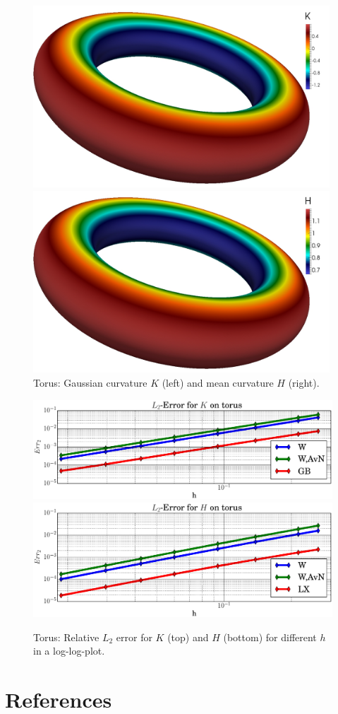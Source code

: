   \begin{figure}
    \begin{minipage}[htp]{.23\textwidth}
      \centering
      \includegraphics[width=0.99\textwidth]{bilder/torus/K.jpg}
    \end{minipage}\hfill
    \begin{minipage}[htp]{.23\textwidth}
      \centering
      \includegraphics[width=0.99\textwidth]{bilder/torus/H.jpg}
    \end{minipage}
    \caption{Torus: Gaussian curvature \( K \) (left) and mean curvature \( H \) (right).}
    \label{figTorus}
  \end{figure}

  \begin{figure}
    \centering\includegraphics[width=.49\textwidth]{bilder/torus/L2K.eps}
    \centering\includegraphics[width=.49\textwidth]{bilder/torus/L2H.eps}
    \caption{Torus: Relative \( L_{2} \) error for \( K \) (top) and
                                                     \( H \) (bottom) for different \( h \) in a log-log-plot.}
    \label{figTorusL2Err}
  \end{figure}



\section*{References}




